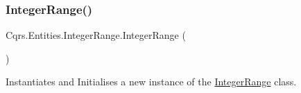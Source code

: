 \subsubsection{\texorpdfstring{Integer\+Range()}{IntegerRange()}}
{\footnotesize\ttfamily Cqrs.\+Entities.\+Integer\+Range.\+Integer\+Range (\begin{DoxyParamCaption}{ }\end{DoxyParamCaption})}



Instantiates and Initialises a new instance of the \hyperlink{classCqrs_1_1Entities_1_1IntegerRange}{Integer\+Range} class. 

